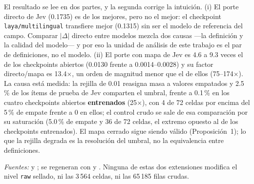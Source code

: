 \begin{table}[t]
\centering
\caption{Porte del umbral en el conjunto combinado, por modelo. La última columna es la fracción media de ítems de
prueba que comparten el umbral (empates inducidos por la rejilla de 0.01 del servicio).}
\label{tab:porte-pagado}
{\footnotesize
\setlength{\tabcolsep}{3pt}
}
\end{table}

El resultado se lee en dos partes, y la segunda corrige la intuición. (i) El porte directo de Jev (0.1735) es
de los mejores, pero no el mejor: el checkpoint \texttt{laya/multilingual} transfiere mejor (0.1315) sin
ser el modelo de referencia del campo. Comparar $\lvert\Delta\rvert$ directo entre modelos mezcla dos causas ---la
definición y la calidad del modelo--- y por eso la unidad de análisis de este trabajo es el par de
definiciones, no el modelo. (ii) El porte con mapa de Jev es 4.6 a 9.3 veces el de los checkpoints abiertos (0.0130
frente a 0.0014--0.0028) y su factor directo/mapa es 13.4$\times$, un orden de magnitud menor que el de
ellos (75--174$\times$). La causa está medida: la rejilla de 0.01 reasigna masa a valores empatados y
2.5\,\% de los ítems de prueba de Jev comparten el umbral, frente a 0.1\,\% en los cuatro checkpoints abiertos
\textbf{entrenados}
(25$\times$), con 4 de 72 celdas por encima del 5\,\% de empate frente a 0 en ellos; el control crudo se sale de
esa comparación por su saturación (5.0\,\% de empate y 36 de 72 celdas, el extremo opuesto al de los checkpoints
entrenados). El mapa cerrado sigue
siendo válido (Proposición~1); lo que la rejilla degrada es la resolución del umbral, no la equivalencia
entre definiciones.

\emph{Fuentes:}  y
; se regeneran con
 y . Ninguna de estas dos
extensiones modifica el nivel \texttt{raw} sellado, ni las 3\,564 celdas, ni las 65\,185 filas crudas.
